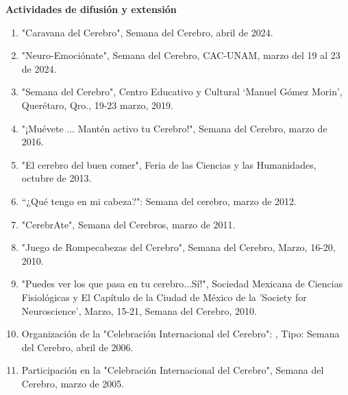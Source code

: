 \textbf{Actividades de difusión y extensión}

\hfill

\begin{enumerate}

\item "Caravana del Cerebro", Semana del Cerebro, abril de 2024.

\item "Neuro-Emociónate", Semana del Cerebro, CAC-UNAM, marzo del 19 al 23 de 2024.

\item "Semana del Cerebro", Centro Educativo y Cultural ‘Manuel Gómez Morin’, Querétaro, Qro., 19-23 marzo, 2019.

\item "¡Muévete ... Mantén activo tu Cerebro!", Semana del Cerebro, marzo de 2016.

\item "El cerebro del buen comer", Feria de las Ciencias y las Humanidades, octubre de 2013.

\item “¿Qué tengo en mi cabeza?": Semana del cerebro, marzo de 2012.

\item "CerebrAte", Semana del Cerebros, marzo de 2011.

\item "Juego de Rompecabezas del Cerebro", Semana del Cerebro, Marzo, 16-20,  2010.

\item "Puedes ver los que pasa en tu cerebro...Sí!",  Sociedad Mexicana de Ciencias Fisiológicas y El Capítulo de la Ciudad 
de México de la 'Society for Neuroscience', Marzo, 15-21, Semana del Cerebro, 2010.

\item Organización de la "Celebración Internacional del Cerebro": , Tipo: Semana del Cerebro, abril de 2006.

\item Participación en la "Celebración Internacional del Cerebro", Semana del Cerebro, marzo de 2005.

\end{enumerate}
